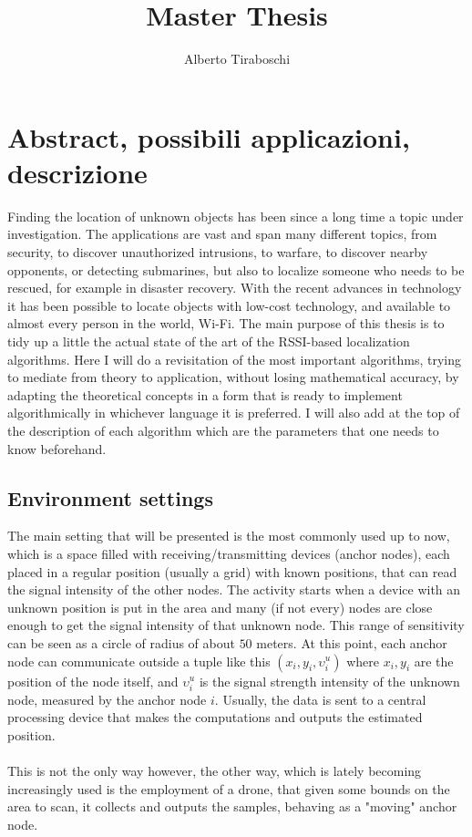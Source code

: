 \documentclass[12pt,twoside]{report}
\title{Master Thesis}
\author{Alberto Tiraboschi}
\begin{document}

\maketitle
\clearpage
\thispagestyle{empty}
\tableofcontents
\thispagestyle{empty}
\clearpage

\setcounter{page}{1}

\chapter{Abstract, possibili applicazioni, descrizione}
Finding the location of unknown objects has been since a long time a topic under investigation. The applications are vast and span many different topics, from security, to discover unauthorized intrusions, to warfare, to discover nearby opponents, or detecting submarines, but also to localize someone who needs to be rescued, for example in disaster recovery. With the recent advances in technology it has been possible to locate objects with low-cost technology, and available to almost every person in the world, Wi-Fi. The main purpose of this thesis is to tidy up a little the actual state of the art of the RSSI-based localization algorithms. Here I will do a revisitation of the most important algorithms, trying to mediate from theory to application, without losing mathematical accuracy, by adapting the theoretical concepts in a form that is ready to implement algorithmically in whichever language it is preferred. I will also add at the top of the description of each algorithm which are the parameters that one needs to know beforehand.

\section{Environment settings}
The main setting that will be presented is the most commonly used up to now, which is a space filled with receiving/transmitting devices (anchor nodes), each placed in a regular position (usually a grid) with known positions, that can read the signal intensity of the other nodes. The activity starts when a device with an unknown position is put in the area and many (if not every) nodes are close enough to get the signal intensity of that unknown node. This range of sensitivity can be seen as a circle of radius of about $50$ meters. At this point, each anchor node can communicate outside a tuple like this $(x_i,y_i,\upsilon_i^u)$ where $x_i,y_i$ are the position of the node itself, and $\upsilon_i^u$ is the signal strength intensity of the unknown node, measured by the anchor node $i$. Usually, the data is sent to a central processing device that makes the computations and outputs the estimated position. \\\\
This is not the only way however, the other way, which is lately becoming increasingly used is the employment of a drone, that given some bounds on the area to scan, it collects and outputs the samples, behaving as a "moving" anchor node.
\end{document}
